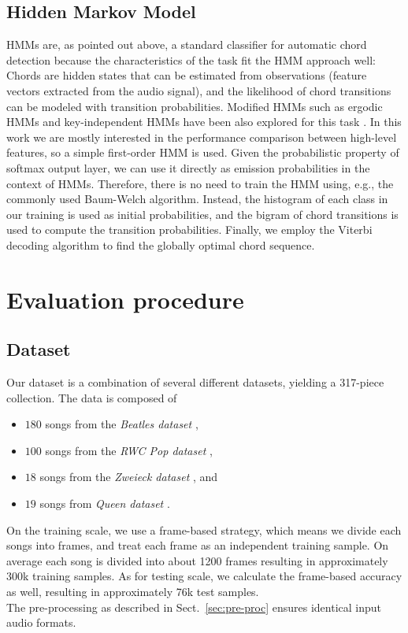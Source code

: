 \documentclass{article}
\begin{document}
\subsection{Hidden Markov Model}
HMMs are, as pointed out above, a standard classifier for automatic chord detection because the characteristics of the task fit the HMM approach well: Chords are hidden states that can be estimated from observations (feature vectors extracted from the audio signal), and the likelihood of chord transitions can be modeled with transition probabilities. 
Modified HMMs such as ergodic HMMs and key-independent HMMs have been also explored for this task \cite{papadopoulos2007large,lee2008acoustic}. In this work we are mostly interested in the performance comparison between high-level features, so a simple first-order HMM is used. 
Given the probabilistic property of softmax output layer, we can use it directly as emission probabilities in the context of HMMs. Therefore, there is no need to train the HMM using, e.g., the commonly used Baum-Welch algorithm. Instead, the histogram of each class in our training is used as initial probabilities, and the bigram of chord transitions is used to compute the transition probabilities. Finally, we employ the Viterbi decoding algorithm to find the globally optimal chord sequence. 

\section{Evaluation procedure}
\subsection{Dataset}
Our dataset is a combination of several different datasets, yielding a 317-piece collection. The data is composed of 
\begin{itemize}
	\item   $180$ songs from the \textit{Beatles dataset} \cite{mauch2009omras2},
    \item   $100$ songs from the \textit{RWC Pop dataset} \cite{goto2002rwc}, 
    \item   $18$ songs from the \textit{Zweieck dataset} \cite{mauch2009omras2}, and 
    \item   $19$ songs from \textit{Queen dataset} \cite{mauch2009omras2}.
\end{itemize}  
On the training scale, we use a frame-based strategy, which means we divide each songs into frames, and treat each frame as an independent training sample. On average each song is divided into about 1200 frames resulting in approximately 300k training samples. As for testing scale, we calculate the frame-based accuracy as well, resulting in approximately 76k test samples. \\
The pre-processing as described in Sect.~\ref{sec:pre-proc} ensures identical input audio formats.
\end{document}
